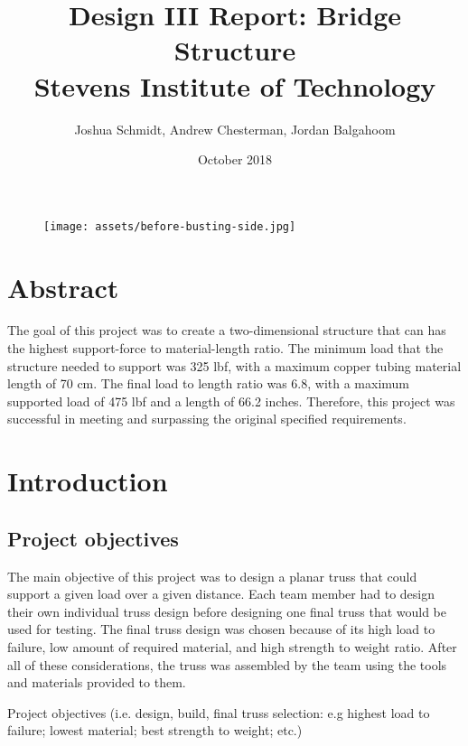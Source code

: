 \documentclass{article}
\title{%
  Design III Report: Bridge Structure \\
	\large Stevens Institute of Technology}
\date{October 2018}
\author{Joshua Schmidt, Andrew Chesterman, Jordan Balgahoom}
\let\Oldsection\section
\renewcommand{\section}{\FloatBarrier\Oldsection}
\let\Oldsubsection\subsection
\renewcommand{\subsection}{\FloatBarrier\Oldsubsection}
\begin{document}
\maketitle

\bigskip
\bigskip
\bigskip
\bigskip

\begin{figure}[!htb]
  \centering
  \texttt{[image: assets/before-busting-side.jpg]}
  \label{fig:logo}
\end{figure}

\newpage

\tableofcontents

\newpage


\section{Abstract}

The goal of this project was to create a two-dimensional structure that can has the highest support-force to material-length ratio. The minimum load that the structure needed to support was 325 lbf, with a maximum copper tubing material length of 70 cm. The final load to length ratio was 6.8, with a maximum supported load of 475 lbf and a length of 66.2 inches. Therefore, this project was successful in meeting and surpassing the original specified requirements.

\newpage

\section{Introduction}

\subsection{Project objectives}

The main objective of this project was to design a planar truss that could support a given load over a given distance. Each team member had to design their own individual truss design before designing one final truss that would be used for testing. The final truss design was chosen because of its high load to failure, low amount of required material, and high strength to weight ratio. After all of these considerations, the truss was assembled by the team using the tools and materials provided to them.  

Project objectives (i.e. design, build, final truss selection: e.g highest load to failure; lowest material; best strength to weight; etc.)
\end{document}
